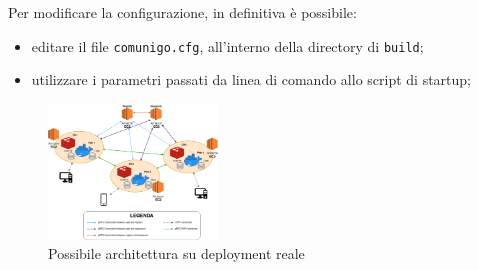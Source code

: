 \documentclass[conference]{IEEEtran}
\begin{document}
Per modificare la configurazione, in definitiva è possibile:
\begin{itemize}
\item editare il file \texttt{comunigo.cfg}, all'interno della directory di \texttt{build};
\item utilizzare i parametri passati da linea di comando allo script di startup;
\end{itemize}


\begin{figure}[htbp]
\centerline{\includegraphics[width=0.4\textwidth]{figs/architecture-real.png}}
\caption{Possibile architettura su deployment reale}
\label{fig:architecture-real}
\end{figure}
\end{document}
